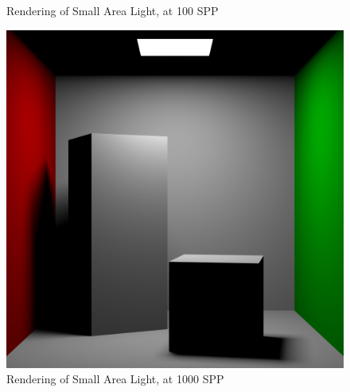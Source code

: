 \documentclass[a4paper]{myarticle}
\begin{document}
\begin{figure}[H]
\begin{minipage}[t]{.3\textwidth}
      \caption{Rendering of Small Area Light, at 100 SPP}
  \end{minipage}
  \hfill
  \begin{minipage}[t]{.3\textwidth}
      \centering
      \includegraphics[width=\textwidth]{q3/small_2_1000.png}
      \caption{Rendering of Small Area Light, at 1000 SPP}
  \end{minipage}
\end{figure}
\end{document}
